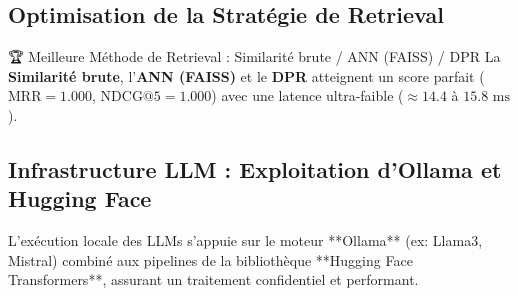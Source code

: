 \documentclass[12pt,a4paper,oneside]{report}
\begin{document}
\subsection{Optimisation de la Stratégie de Retrieval}
\begin{table}[H]
\centering
\small
\caption{Benchmark des 6 méthodes de Retrieval (Données Identiques Plateforme - 6 Colonnes Exactes)}
\label{tab:retrieval_metrics}
\end{table}

\begin{bestbox}{🏆 Meilleure Méthode de Retrieval : Similarité brute / ANN (FAISS) / DPR}
La \textbf{Similarité brute}, l'\textbf{ANN (FAISS)} et le \textbf{DPR} atteignent un score parfait ($\text{MRR}=1.000$, $\text{NDCG@5}=1.000$) avec une latence ultra-faible ($\approx 14.4$ à $15.8\text{ ms}$).
\end{bestbox}

\subsection{Infrastructure LLM : Exploitation d'Ollama et Hugging Face}
L'exécution locale des LLMs s'appuie sur le moteur **Ollama** (ex: Llama3, Mistral) combiné aux pipelines de la bibliothèque **Hugging Face Transformers**, assurant un traitement confidentiel et performant.

\newpage

\end{document}
